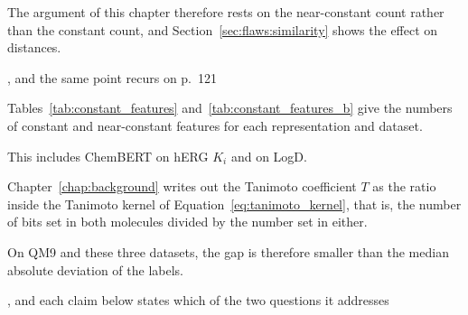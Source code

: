 
The argument of this chapter therefore rests on the near-constant count rather than the constant count, and Section~\ref{sec:flaws:similarity} shows the effect on distances.

, and the same point recurs on p.~121

Tables~\ref{tab:constant_features} and~\ref{tab:constant_features_b} give the numbers of constant and near-constant features for each representation and dataset.

This includes ChemBERT on hERG $K_i$ and on LogD.

Chapter~\ref{chap:background} writes out the Tanimoto coefficient $T$ as the ratio inside the Tanimoto kernel of Equation~\ref{eq:tanimoto_kernel}, that is, the number of bits set in both molecules divided by the number set in either.

On QM9 and these three datasets, the gap is therefore smaller than the median absolute deviation of the labels.

, and each claim below states which of the two questions it addresses

